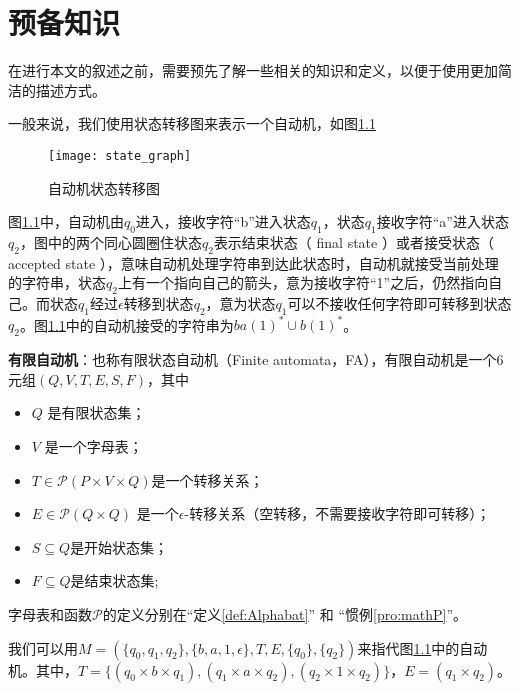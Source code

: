\chapter{预备知识}
在进行本文的叙述之前，需要预先了解一些相关的知识和定义，以便于使用更加简洁的描述方式。

一般来说，我们使用状态转移图来表示一个自动机，如图\ref{fig:state_graph}

\begin{figure}[!htbp]
    \centering
    \texttt{[image: state\_graph]}
    \caption{自动机状态转移图}
    \label{fig:state_graph}
\end{figure}

图\ref{fig:state_graph}中，自动机由$q_0$进入，接收字符“b”进入状态$q_1$，状态$q_1$接收字符“a”进入状态$q_2$，图中的两个同心圆圈住状态$q_2$表示结束状态（ final state ）或者接受状态（ accepted state ），意味自动机处理字符串到达此状态时，自动机就接受当前处理的字符串，状态$q_2$上有一个指向自己的箭头，意为接收字符“1”之后，仍然指向自己。而状态$q_1$经过$\epsilon$转移到状态$q_2$，意为状态$q_1$可以不接收任何字符即可转移到状态$q_2$。图\ref{fig:state_graph}中的自动机接受的字符串为$ba(1)^*\cup b(1)^*$。

\begin{definition}
    \textbf{有限自动机}\cite{watson1993taxonomyb}：也称有限状态自动机（Finite automata，FA），有限自动机是一个6元组$(Q,V,T,E,S,F)$，其中
    \begin{itemize}
        \item $Q$ 是有限状态集；
        \item $V$ 是一个字母表；
        \item $ T \in \mathcal{P}(P\times V \times Q) $是一个转移关系；
        \item $ E \in \mathcal{P}(Q\times Q)$ 是一个$\epsilon$-转移关系（空转移，不需要接收字符即可转移）；
        \item $ S \subseteq Q $是开始状态集；
        \item $ F \subseteq Q $是结束状态集;
    \end{itemize}
    字母表和函数$\mathcal{P}$的定义分别在“定义\ref{def:Alphabat}” 和 “惯例\ref{pro:mathP}”。
\end{definition}

\begin{example}
    我们可以用$M=(\{q_0,q_1,q_2\},\{b,a,1,\epsilon\},T,E,\{q_0\},\{q_2\})$来指代图\ref{fig:state_graph}中的自动机。其中，$T=\{(q_0 \times b \times q_1),(q_1\times a \times q_2),(q_2\times 1 \times q_2)\}$，$E=(q_1 \times q_2)$。
\end{example}

